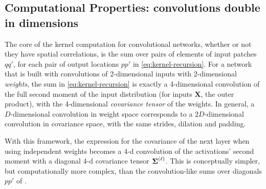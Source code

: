 \documentclass{article}
\theoremstyle{definition}
\newcommand{\vX}{\mathbf{X}}
\begin{document}
\subsection{Computational Properties: convolutions double in dimensions}


The core of the kernel computation for convolutional networks, whether or not they have spatial correlations, is the sum over pairs of elements of input patches $qq'$, for each pair of output locations $pp'$ in \cref{eq:kernel-recursion}. For a network that is built with convolutions of 2-dimensional inputs with 2-dimensional \emph{weights}, the sum in \ref{eq:kernel-recursion} is exactly a 4-dimensional convolution of the full second moment of the input distribution (for inputs $\vX$, the outer product), with the 4-dimensional \emph{covariance tensor} of the weights. In general, a $D$-dimensional convolution in weight space corresponds to a $2D$-dimensional convolution in covariance space, with the same strides, dilation and padding.

With this framework, the expression for the covariance of the next layer when using independent weights becomes a 4-d convolution of the activations' second moment with a diagonal 4-d covariance tensor $\boldsymbol{\Sigma}^{(\ell)}$. This is conceptually simpler, but computationally more complex, than the convolution-like sums over diagonals $pp'$ of \citet{arora2019exact}.
\end{document}
